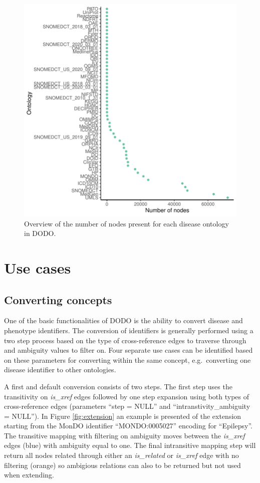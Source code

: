 \documentclass[9pt,a4paper,]{extarticle}
\begin{document}
\begin{figure}

{\centering \includegraphics[width=0.5\linewidth]{DODO-F1000-publication_files/figure-latex/listDB-1} 

}

\caption{Overview of the number of nodes present for each disease ontology in DODO.}\label{fig:listDB}
\end{figure}

\hypertarget{use-cases}{%
\section{Use cases}\label{use-cases}}

\hypertarget{converting-concepts}{%
\subsection{Converting concepts}\label{converting-concepts}}

One of the basic functionalities of DODO is the ability to convert disease and phenotype identifiers. The conversion of identifiers is generally performed using a two step process based on the type of cross-reference edges to traverse through and ambiguity values to filter on. Four separate use cases can be identified based on these parameters for converting within the same concept, e.g.~converting one disease identifier to other ontologies.

A first and default conversion consists of two steps. The first step uses the transitivity on \emph{is\_xref} edges followed by one step expansion using both types of cross-reference edges (parameters ``step = NULL'' and ``intranstivity\_ambiguity = NULL''). In Figure \ref{fig:extension} an example is presented of the extension starting from the MonDO identifier ``MONDO:0005027'' encoding for ``Epilepsy''. The transitive mapping with filtering on ambiguity moves between the \emph{is\_xref} edges (blue) with ambiguity equal to one. The final intransitive mapping step will return all nodes related through either an \emph{is\_related} or \emph{is\_xref} edge with no filtering (orange) so ambigious relations can also to be returned but not used when extending.
\end{document}
